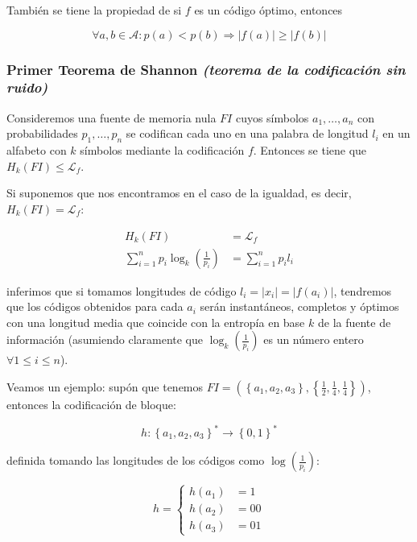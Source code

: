 También se tiene la propiedad de si \(f\) es un código óptimo, entonces

\[
\forall a,b\in\mathcal{A}:p(a)<p(b)\Rightarrow \left|f(a)\right|\geq\left|f(b)\right|
\]

\subsubsection{\texorpdfstring{Primer Teorema de Shannon \emph{(teorema
de la codificación sin
ruido)}}{Primer Teorema de Shannon (teorema de la codificación sin ruido)}}\label{primer-teorema-de-shannon-teorema-de-la-codificaciuxf3n-sin-ruido}

Consideremos una fuente de memoria nula \(FI\) cuyos símbolos
\(a_1,\dots,a_n\) con probabilidades \(p_1,\dots,p_n\) se codifican cada
uno en una palabra de longitud \(l_i\) en un alfabeto con \(k\) símbolos
mediante la codificación \(f\). Entonces se tiene que
\(H_k\left(FI\right)\leq\mathcal{L}_f\).

Si suponemos que nos encontramos en el caso de la igualdad, es decir,
\(H_k\left(FI\right)=\mathcal{L}_f\):


\begin{align*}
H_k\left(FI\right)&=\mathcal{L}_f\\
\sum_{i=1}^np_i\log_k\left(\frac{1}{p_i}\right)&=\sum_{i=1}^np_il_i
\end{align*}


inferimos que si tomamos longitudes de código
\(l_i=\left|x_i\right|=\left|f(a_i)\right|\), tendremos que los códigos
obtenidos para cada \(a_i\) serán instantáneos, completos y óptimos con
una longitud media que coincide con la entropía en base \(k\) de la
fuente de información (asumiendo claramente que
\(\log_k\left(\frac{1}{p_i}\right)\) es un número entero
\(\forall 1\leq i\leq n\)).

Veamos un ejemplo: supón que tenemos
\(FI=\left(\left\{a_1,a_2,a_3\right\},\left\{\frac{1}{2},\frac{1}{4},\frac{1}{4}\right\}\right)\),
entonces la codificación de bloque:

\[
h:\left\{a_1,a_2,a_3\right\}^*\rightarrow\left\{0,1\right\}^*
\]

definida tomando las longitudes de los códigos como
\(\log\left(\frac{1}{p_i}\right)\):

\[
h=\begin{cases}
h\left(a_1\right) &= 1\\
h\left(a_2\right) &= 00\\
h\left(a_3\right) &= 01
\end{cases}
\]

